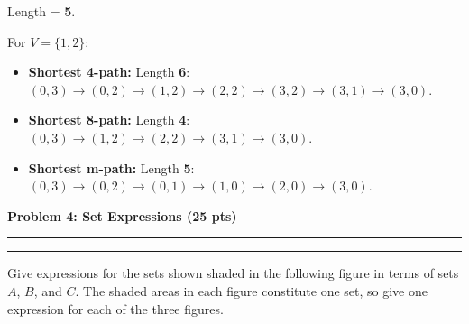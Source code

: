 \documentclass[12pt]{article}
\newcommand{\question}[1]{%
  \clearpage
  \vspace{0.5cm}
  {\noindent\normalsize \textbf{#1}}
  \vspace{0.2cm}
  \hrule
  \vspace{0.1cm}
  \hrule
  \vspace{0.3cm}
}
\begin{document}
\begin{stepbox}
Length = \textbf{5}.
\end{stepbox}

\begin{resultsbox}
For $V = \{1,2\}$:
\begin{itemize}
    \item \textbf{Shortest 4-path:} Length \textbf{6}: $(0,3) \to (0,2) \to (1,2) \to (2,2) \to (3,2) \to (3,1) \to (3,0)$.
    \item \textbf{Shortest 8-path:} Length \textbf{4}: $(0,3) \to (1,2) \to (2,2) \to (3,1) \to (3,0)$.
    \item \textbf{Shortest m-path:} Length \textbf{5}: $(0,3) \to (0,2) \to (0,1) \to (1,0) \to (2,0) \to (3,0)$.
\end{itemize}
\end{resultsbox}



\question{Problem 4: Set Expressions (25 pts)}\label{quest:4}

Give expressions for the sets shown shaded in the following figure in terms of sets $A$, $B$, and $C$. The shaded areas in each figure constitute one set, so give one expression for each of the three figures.
\end{document}
